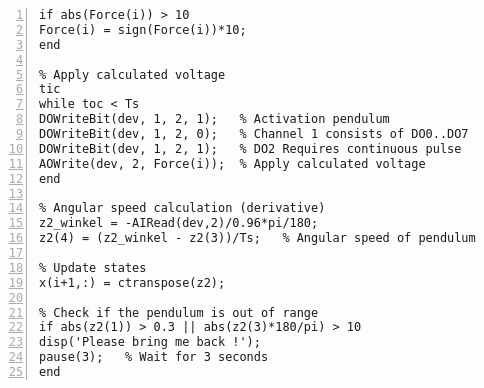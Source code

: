 \begin{lstlisting}[numbers=left,basicstyle=\scriptsize,caption={Source code of linear quadratic regulator (Real implementation).},captionpos=b]
% Voltage limitation
if abs(Force(i)) > 10
Force(i) = sign(Force(i))*10; 
end

% Apply calculated voltage    
tic
while toc < Ts
DOWriteBit(dev, 1, 2, 1);   % Activation pendulum
DOWriteBit(dev, 1, 2, 0);   % Channel 1 consists of DO0..DO7
DOWriteBit(dev, 1, 2, 1);   % DO2 Requires continuous pulse
AOWrite(dev, 2, Force(i));  % Apply calculated voltage
end

% Angular speed calculation (derivative) 
z2_winkel = -AIRead(dev,2)/0.96*pi/180;
z2(4) = (z2_winkel - z2(3))/Ts;   % Angular speed of pendulum

% Update states
x(i+1,:) = ctranspose(z2);

% Check if the pendulum is out of range
if abs(z2(1)) > 0.3 || abs(z2(3)*180/pi) > 10    
disp('Please bring me back !');
pause(3);   % Wait for 3 seconds
end
\end{lstlisting}